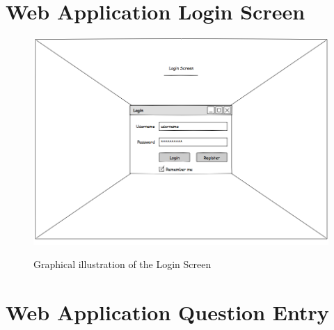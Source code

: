 \appendix

\newpage

\section{Web Application Login Screen}

\begin{figure}[htbp]
\center \includegraphics[width=400pt]{Figures/Login_Screen}\\
\caption{Graphical illustration of the Login Screen} \label{Figure: Graphical illustration of the Login Screen}
\end{figure}

\newpage

\section{Web Application Question Entry}
\label{Appendix: Coarse Zone Description}


